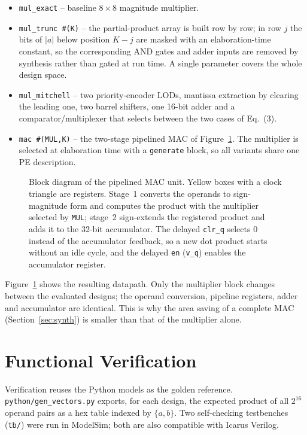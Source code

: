 \documentclass[11pt,a4paper]{article}
\begin{document}
\begin{itemize}[nosep]
  \item \texttt{mul\_exact} -- baseline $8\times8$ magnitude multiplier.
  \item \texttt{mul\_trunc \#(K)} -- the partial-product array is built
        row by row; in row $j$ the bits of $|a|$ below position $K-j$ are
        masked with an elaboration-time constant, so the corresponding AND
        gates and adder inputs are removed by synthesis rather than gated at
        run time. A single parameter covers the whole design space.
  \item \texttt{mul\_mitchell} -- two priority-encoder LODs, mantissa
        extraction by clearing the leading one, two barrel shifters, one
        16-bit adder and a comparator/multiplexer that selects between the
        two cases of Eq.~(3).
  \item \texttt{mac \#(MUL,K)} -- the two-stage pipelined MAC of
        Figure~\ref{fig:mac}. The multiplier is selected at elaboration time
        with a \texttt{generate} block, so all variants share one PE
        description.
\end{itemize}

\begin{figure}[H]
\centering
\resizebox{\textwidth}{!}{}
\caption{Block diagram of the pipelined MAC unit. Yellow boxes with a
clock triangle are registers. Stage~1 converts the operands to sign-magnitude form and
computes the product with the multiplier selected by \texttt{MUL};
stage~2 sign-extends the registered product and adds it to the 32-bit
accumulator. The delayed \texttt{clr\_q} selects 0 instead of the
accumulator feedback, so a new dot product starts without an idle cycle,
and the delayed \texttt{en} (\texttt{v\_q}) enables the accumulator
register.}
\label{fig:mac}
\end{figure}

Figure~\ref{fig:mac} shows the resulting datapath. Only the multiplier
block changes between the evaluated designs; the operand conversion,
pipeline registers, adder and accumulator are identical. This is why the
area saving of a complete MAC (Section~\ref{sec:synth}) is smaller than
that of the multiplier alone.

\section{Functional Verification}
Verification reuses the Python models as the golden reference.
\texttt{python/gen\_vectors.py} exports, for each design, the expected
product of all $2^{16}$ operand pairs as a hex table indexed by
$\{a,b\}$. Two self-checking testbenches (\texttt{tb/}) were run in
ModelSim; both are also compatible with Icarus Verilog.
\end{document}
